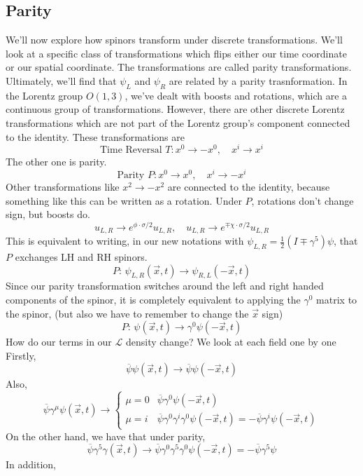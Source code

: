 \subsection{Parity} 
We'll now explore how spinors transform under discrete 
transformations. We'll look at a specific class of transformations 
which flips either our time coordinate or our spatial coordinate. 
The transformations are called parity transformations. 
Ultimately, we'll find that 
$ \psi _ L $ and $ \psi _ R $ are related by a parity trasnformation. 
In the Lorentz group $ O ( 1, 3 ) $, we've 
dealt with boosts and rotations, which are a continuous 
group of transformations. However, there are other discrete Lorentz transformations 
which are not part of the Lorentz group's component connected to the identity. 
These transformations are  
\[
 \text{Time Reversal } T : x ^ 0 \to  - x ^ 0 , \quad x ^ i \to x ^ i 
\] The other one is parity. 
\[
 \text{Parity } P : x ^ 0 \to x ^ 0 , \quad x ^ i \to  - x ^ i 
\] Other transformations like  $x ^ 2 \to - x ^ 2 $
are connected to the identity, because something like this can 
be written as a rotation. 
Under $ P $, rotations don't change sign, but 
boosts do. 
\[
 u_{ L , R } \to e^{ \phi \cdot  \sigma / 2} u_{ L , R }, \quad 
 u _{ L, R } \to e^{  \mp \chi \cdot  \sigma / 2} u_{ L, R }
\] This is equivalent to writing, 
in our new notations with $ \psi _{ L , R }  = \frac{1}{2 } ( I \mp \gamma ^ 5 )  \psi $, 
that  $ P $ exchanges LH and RH spinors. 
\[ 
	P : \,  \psi_{ L , R } ( \vec{x} , t ) \to \psi_{ R, L } ( - \vec{x} ,  t) 
\] Since our parity transformation switches around 
the left and right handed components of the spinor, it is 
completely equivalent to applying the $ \gamma ^ 0 $ matrix to the spinor, 
(but also we have to remember to change the $ \vec{x} $ sign) 
\[
	P : \,  \psi ( \vec{x}, t ) \to \gamma ^ 0 \psi ( - \vec{x}, t ) 
\]
How do our terms in our $\mathcal{ L } $ density change? We look at each field one 
by one 
Firstly, 
\[
	\overline{ \psi } \psi ( \vec{x}, t) \to \overline{ \psi } \psi ( - \vec{x}, t ) 
\] Also, 
\[
	\overline{\psi } \gamma ^ \mu \psi ( \vec{x}, t ) \to \begin{cases}
		\mu = 0 & \overline{ \psi } \gamma ^ 0 \psi ( - \vec{x}, t ) \\
		\mu = i & \overline{ \psi } \gamma ^ 0 \gamma ^ i \gamma ^ 0 \psi ( -\vec{x}, t ) 
		= - \overline{ \psi } \gamma ^ i \psi ( - \vec{x}, t ) 
	\end{cases}
\] On the other hand, we have that under parity, 
\[
	\overline{ \psi } \gamma ^ 5 \gamma ( \vec{x}, t ) \to \overline{ \psi } \gamma ^ 0 \gamma ^ 5 \gamma ^ 0 
	\psi ( - \vec{x}, t ) = - \overline{ \psi } \gamma ^ 5 \psi 
\] In addition, 
